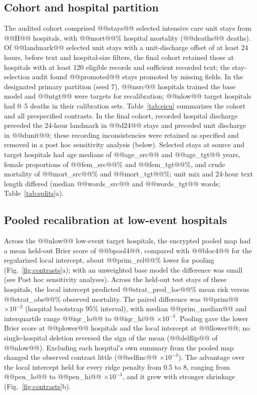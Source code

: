\documentclass[11pt]{article}
\begin{document}
\subsection*{Cohort and hospital partition}
The audited cohort comprised @@stays@@ selected intensive care unit stays from @@H@@ hospitals, with @@mort@@\% hospital mortality (@@deaths@@ deaths). Of @@landmark@@ selected unit stays with a unit-discharge offset of at least 24 hours, before text and hospital-size filters, the final cohort retained those at hospitals with at least 120 eligible records and sufficient recorded text; the stay-selection audit found @@promoted@@ stays promoted by missing fields. In the designated primary partition (seed 7), @@nsrc@@ hospitals trained the base model and @@ntgt@@ were targets for recalibration; @@nlow@@ target hospitals had 0--5 deaths in their calibration sets. Table~\ref{tab:eicu} summarizes the cohort and all prespecified contrasts. In the final cohort, recorded hospital discharge preceded the 24-hour landmark in @@d24@@ stays and preceded unit discharge in @@dunit@@; these recording inconsistencies were retained as specified and removed in a post hoc sensitivity analysis (below). Selected stays at source and target hospitals had age medians of @@age_src@@ and @@age_tgt@@ years, female proportions of @@fem_src@@\% and @@fem_tgt@@\%, and crude mortality of @@mort_src@@\% and @@mort_tgt@@\%; unit mix and 24-hour text length differed (median @@words_src@@ and @@words_tgt@@ words; Table~\ref{tab:splits}a).

\subsection*{Pooled recalibration at low-event hospitals}
Across the @@nlow@@ low-event target hospitals, the encrypted pooled map had a mean held-out Brier score of @@bpool4@@, compared with @@bloc4@@ for the regularized local intercept, about @@prim_rel@@\% lower for pooling (Fig.~\ref{fig:contrasts}a); with an unweighted base model the difference was small (see Post hoc sensitivity analyses). Across the held-out test stays of these hospitals, the local intercept predicted @@strat_pred_loc@@\% mean risk versus @@strat_obs@@\% observed mortality. The paired difference was @@prim@@ $\times10^{-3}$ (hospital bootstrap 95\% interval), with median @@prim_median@@ and interquartile range @@iqr_lo@@ to @@iqr_hi@@ $\times10^{-3}$. Pooling gave the lower Brier score at @@plower@@ hospitals and the local intercept at @@llower@@; no single-hospital deletion reversed the sign of the mean (@@delflip@@ of @@nlow@@). Excluding each hospital's own summary from the pooled map changed the observed contrast little (@@selfinc@@ $\times10^{-3}$). The advantage over the local intercept held for every ridge penalty from 0.5 to 8, ranging from @@pen_lo@@ to @@pen_hi@@ $\times10^{-3}$, and it grew with stronger shrinkage (Fig.~\ref{fig:contrasts}b).
\end{document}
